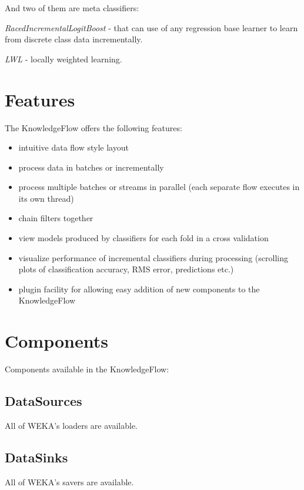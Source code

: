 \noindent And two of them are meta classifiers:
\begin{tight_itemize}
	\item \textit{RacedIncrementalLogitBoost} - that can use of any regression base
learner to learn from discrete class data incrementally.
	\item \textit{LWL} - locally weighted learning.
\end{tight_itemize}


\newpage
\section{Features}

The KnowledgeFlow offers the following features:
\begin{itemize}
	\item intuitive data flow style layout
	\item process data in batches or incrementally 
	\item process multiple batches or streams in parallel (each separate flow 
  	executes in its own thread)
	\item chain filters together
	\item view models produced by classifiers for each fold in a cross validation
	\item visualize performance of incremental classifiers during 
  	processing (scrolling plots of classification accuracy, RMS error, 
  	predictions etc.)
        \item plugin facility for allowing easy addition of new components
        to the KnowledgeFlow
\end{itemize}

\newpage
\section{Components}
Components available in the KnowledgeFlow:

\subsection{DataSources} All of WEKA's loaders are available.
\begin{center}
\end{center}

\subsection{DataSinks} All of WEKA's savers are available.
\begin{center}
\end{center}

